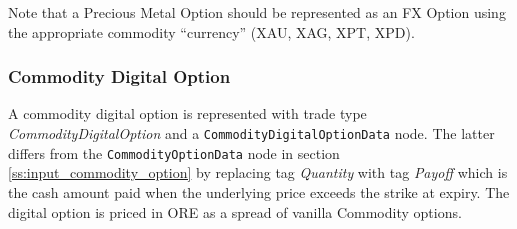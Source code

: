 Note that a Precious Metal Option should be represented as an FX
Option using the appropriate commodity ``currency'' (XAU, XAG, XPT, XPD).

\subsubsection{Commodity Digital Option}
\label{ss:input_commodity_digital_option}

A commodity digital option is represented with trade type  \emph{CommodityDigitalOption} and a \lstinline!CommodityDigitalOptionData! node.
The latter differs from the \lstinline!CommodityOptionData! node in section \ref{ss:input_commodity_option} by replacing tag \emph{Quantity}
with tag \emph{Payoff} which is the cash amount paid when the underlying price exceeds the strike at expiry.
The digital option is priced in ORE as a spread of vanilla Commodity options.
